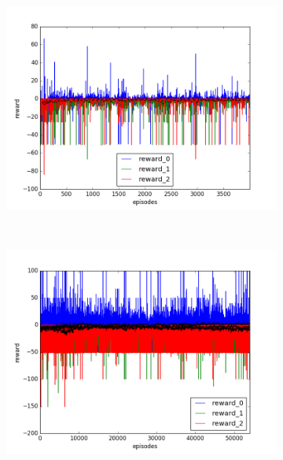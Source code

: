 \begin{figure}[t]
  \vspace{\graphspacing}
  \begin{subfigure}[t]{\figscale\linewidth}
    \hspace*{-2.75cm}
    \includegraphics[width=1.5\textwidth]
    {../results/dqn_2vs1/reward.png}
    \label{fig:dqn-2vs1-reward}
  \end{subfigure}
  ~
  \begin{subfigure}[t]{\figscale\linewidth}
    \hspace*{-1.4cm}
    \includegraphics[width=1.5\textwidth]
    {../results/ddpg_2vs1/reward.png}
    \label{fig:ddpg-2vs1-reward}
  \end{subfigure}
  ~
  \begin{subfigure}[t]{\figscale\linewidth}

\end{subfigure}
\end{figure}
